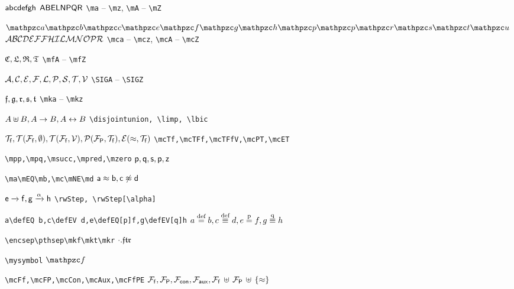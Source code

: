 
$\ma\mb\mc\md\me\mf\mg\mh$ $\mA\mB\mE\mL\mN\mP\mQ\mR$
\hfill 
\verb|\ma| -- \verb|\mz|, \verb|\mA| -- \verb|\mZ|

$\mca\mcb\mcc \mce\mcf\mcg\mch \mcp\mcq\mcr\mcs\mct\mcu$
$\mcA\mcB\mcC\mcD\mcE\mcF\mcG\mcH\mcI \mcL\mcM\mcN\mcO\mcP\mcR$
\hfill
\verb|\mca| -- \verb|\mcz|, \verb|\mcA| -- \verb|\mcZ|


$\mfC,\mfL,\mfR,\mfT$
\hfill
\verb|\mfA| -- \verb|\mfZ|


$\SIGA,\SIGC,\SIGE,\SIGF,\SIGL,\SIGP,\SIGS,\SIGT,\SIGV$
\hfill
\verb|\SIGA| -- \verb|\SIGZ|

$\mkf,\mkg,\mkr,\mks,\mkt$
\hfill
\verb|\mka| -- \verb|\mkz|

\vspace{1em}

$A\disjointunion B,A\limp B,A\lbic B$
\hfill 
\verb|\disjointunion, \limp, \lbic|


$\mcTf,\mcTFf,\mcTFfV,\mcPT,\mcET$
\hfill
\verb|\mcTf,\mcTFf,\mcTFfV,\mcPT,\mcET|

\verb|\mpp,\mpq,\msucc,\mpred,\mzero|
\hfill
$\mpp,\mpq,\msucc,\mpred,\mzero$

\verb|\ma\mEQ\mb,\mc\mNE\md|
\hfill
$\ma\mEQ\mb,\mc\mNE\md$

$\me\rwStep\mf, \mg\rwStep[\alpha]\mh$
\hfill
\verb|\rwStep, \rwStep[\alpha]|

\verb|a\defEQ b,c\defEV d,e\defEQ[p]f,g\defEV[q]h|
\hfill
$a\defEQ b,c\defEV d,e\defEQ[p]f,g\defEV[q]h$

\verb|\encsep\pthsep\mkf\mkt\mkr|
\hfill
$\encsep\pthsep\mkf\mkt\mkr$


\hfill



\hfill


\verb|\mysymbol|
\hfill
$\mysymbol$

\verb|\mcFf,\mcFP,\mcCon,\mcAux,\mcFfPE|
\hfill
$\mcFf,\mcFP,\mcCon,\mcAux,\mcFfPE$

%




